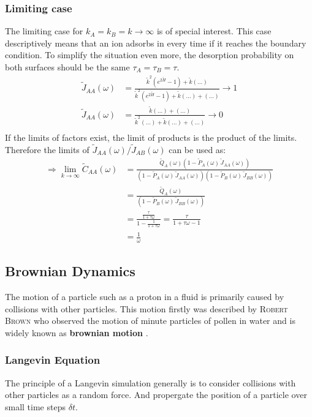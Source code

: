 \documentclass[a4paper, parskip=half]{scrartcl}
\newcommand{\person}[1]{%
	\textsc{#1}%
}
\newcommand{\effect}[1]{%
	\textbf{#1}%
}
\newcommand{\myEqLabel}[1]{\label{eq:#1}}
\begin{document}
\subsubsection{Limiting case}
The limiting case for $k_A = k_B = k \rightarrow \infty$ is of special interest. This case descriptively means that an ion adsorbs in every time if it reaches the boundary condition. To simplify the situation even more, the desorption probability on both surfaces should be the same $\tau_A = \tau_B = \tau$.
\begin{align}
\widetilde{J}_{AA}(\omega) &= \frac{\widetilde{k}^2 \left(e^{2\widetilde{H}} - 1\right) + \widetilde{k}(...)}{\widetilde{k}^2 \left(e^{2\widetilde{H}} - 1\right) + \widetilde{k}(...) + (...)} \rightarrow 1\\
\widetilde{J}_{AA}(\omega) &= \frac{\widetilde{k}(...) + (...)}{\widetilde{k}^2(...) + \widetilde{k}(...) + (...)} \rightarrow 0\\
\end{align}
If the limits of factors exist, the limit of products is the product of the limits. Therefore the limits of $\widetilde{J}_{AA}(\omega)/\widetilde{J}_{AB}(\omega)$ can be used as:
\begin{align}
\Rightarrow \lim_{k\rightarrow\infty} \widetilde{C}_{AA}(\omega) &= \frac{\widetilde{Q}_A(\omega)\left(1 - \widetilde{P}_A(\omega)\, \widetilde{J}_{AA}(\omega) \right)}{\left(1 - \widetilde{P}_A(\omega)\, \widetilde{J}_{AA}(\omega) \right)\left(1 - \widetilde{P}_B(\omega)\, \widetilde{J}_{BB}(\omega) \right)}\\
&= \frac{\widetilde{Q}_A(\omega)}{\left(1 - \widetilde{P}_B(\omega)\, \widetilde{J}_{BB}(\omega) \right)}\\
&= \frac{\frac{\tau}{1+\tau\omega}}{1-\frac{1}{1+\tau\omega}} = \frac{\tau}{1+\tau\omega - 1}\\
&= \frac{1}{\omega} \myEqLabel{analytic_caa}
\end{align}
\newpage
\subsection{Brownian Dynamics}
The motion of a particle such as a proton in a fluid is primarily  caused by collisions with other particles. This motion firstly was described by \person{Robert Brown} who observed the motion of minute particles of pollen in water and is widely known as \effect{brownian motion}.
\subsubsection{Langevin Equation}
The principle of a Langevin simulation generally is to consider collisions with other particles as a random force. And propergate the position of a particle over small time steps $\delta t$.
\end{document}
